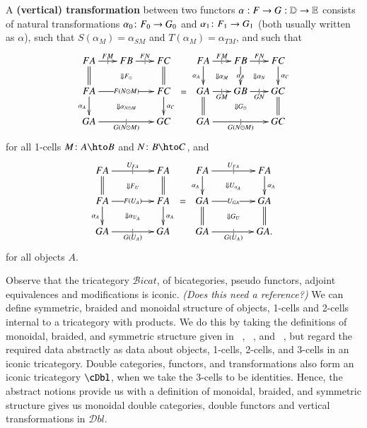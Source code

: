 \documentclass{amsart}
\begin{document}
\begin{defn}\label{thm:dbl-transf}
  A \textbf{(vertical) transformation} between two functors $\alpha:
  F\to G:\mathbb{D}\to\mathbb{E}$ consists of natural transformations $\alpha_0\colon
  F_0\to G_0$ and $\alpha_1\colon F_1\to G_1$ (both usually written as
  $\alpha$), such that $S(\alpha_{M}) = \alpha_{SM}$ and
  $T(\alpha_{M}) = \alpha_{TM}$, and such that
  \[\vcenter{\xymatrix@-.5pc{
      FA \ar@{=}[d] \ar[r]|{|}^{FM}
      \ar@{}[drr]|{\Downarrow F_\odot} &
      FB \ar[r]|{|}^{FN} &
      FC \ar@{=}[d]\\
      FA \ar[rr]|{F(N\odot M)} \ar[d]_{\alpha_A}
      \ar@{}[drr]|{\Downarrow \alpha_{N\odot M}} &&
      FC \ar[d]^{\alpha_C}\\
      GA \ar[rr]|{|}_{G(N\odot M)} && GC
    }} =
  \vcenter{\xymatrix@-.5pc{
      FA \ar[d]_{\alpha_A} \ar@{}[dr]|{\Downarrow \alpha_M} \ar[r]|{|}^{FM} &
      FB \ar[d]|{\alpha_B} \ar@{}[dr]|{\Downarrow \alpha_N} \ar[r]|{|}^{FN} &
      FC \ar[d]^{\alpha_C}\\
      GA \ar@{=}[d] \ar[r]|{|}_{GM} \ar@{}[drr]|{\Downarrow G_\odot} &
      GB \ar[r]|{|}_{GN} &
      GC \ar@{=}[d]\\
      GA \ar[rr]|{|}_{G(N\odot M)} && GC
    }}\]
  for all 1-cells $M\colon A\hto B$ and $N\colon B\hto C$, and
  \[\vcenter{\xymatrix@-.5pc{
      FA \ar[rr]|{|}^{U_{FA}} \ar@{=}[d]
      \ar@{}[drr]|{\Downarrow F_U} &&
      FA \ar@{=}[d]\\
      FA \ar[rr]|{F(U_A)} \ar[d]_{\alpha_A}
      \ar@{}[drr]|{\Downarrow \alpha_{U_A}} &&
      FA \ar[d]^{\alpha_A}\\
      GA \ar[rr]|{|}_{G(U_A)} && GA
    }} =
  \vcenter{\xymatrix@-.5pc{
      FA \ar[rr]|{|}^{U_{FA}} \ar[d]_{\alpha_A}
      \ar@{}[drr]|{\Downarrow U_{\alpha_A}} &&
      FA \ar[d]^{\alpha_A}\\
      GA \ar[rr]|{U_{GA}} \ar@{=}[d]
      \ar@{}[drr]|{\Downarrow G_U} &&
      GA \ar@{=}[d]\\
      GA \ar[rr]|{|}_{G(U_A)} && GA.
    }}\]
  for all objects $A$.
\end{defn}

Observe that the tricategory $\mathcal{B}icat$, of bicategories, pseudo functors, adjoint equivalences and modifications is iconic. {\it(Does this need a reference?)}
We can define symmetric, braided and monoidal structure of objects, 1-cells and 2-cells internal to a tricategory with products. 
We do this by taking the definitions of monoidal, braided, and symmetric structure given in ~\cite{nick:tricatsbook}, ~\cite{mccrudden:bal-coalgb}, and ~\cite{gg:ldstr-tricat}, but regard the required data abstractly as data about objects, 1-cells, 2-cells, and 3-cells in an iconic tricategory. 
Double categories, functors, and transformations also form an iconic tricategory $\cDbl$, when we take the 3-cells to be identities. Hence, the abstract notions provide us with a definition of monoidal, braided, and symmetric structure gives us monoidal double categories, double functors and vertical transformations in $\mathcal{D}bl$.
\end{document}
